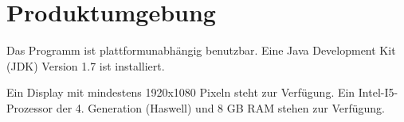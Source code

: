 
\section{Produktumgebung}

Das Programm ist plattformunabhängig benutzbar.
Eine Java Development Kit (JDK) Version 1.7 ist installiert.

Ein Display mit mindestens 1920x1080 Pixeln steht zur Verfügung.
Ein Intel-I5-Prozessor der 4. Generation (Haswell) und 8 GB RAM stehen zur Verfügung.